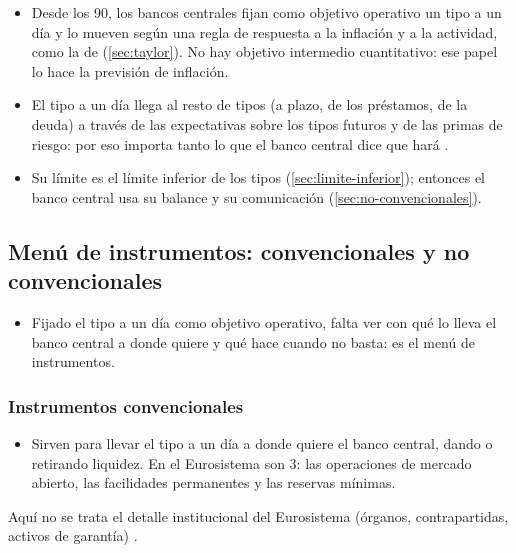 \documentclass[11pt]{article}
\begin{document}
\begin{itemize}
\item Desde los 90, los bancos centrales fijan como objetivo operativo un tipo a un día y lo mueven según una regla de respuesta a la inflación y a la actividad, como la de  (\ref{sec:taylor}). No hay objetivo intermedio cuantitativo: ese papel lo hace la previsión de inflación.
\item El tipo a un día llega al resto de tipos (a plazo, de los préstamos, de la deuda) a través de las expectativas sobre los tipos futuros y de las primas de riesgo: por eso importa tanto lo que el banco central dice que hará .
\item Su límite es el límite inferior de los tipos (\ref{sec:limite-inferior}); entonces el banco central usa su balance y su comunicación (\ref{sec:no-convencionales}).
\end{itemize}

\subsection{Menú de instrumentos: convencionales y no convencionales}\label{sec:instrumentos}

\begin{itemize}
\item Fijado el tipo a un día como objetivo operativo, falta ver con qué lo lleva el banco central a donde quiere y qué hace cuando no basta: es el menú de instrumentos.
\end{itemize}

\subsubsection{Instrumentos convencionales}\label{sec:convencionales}

\begin{itemize}
\item Sirven para llevar el tipo a un día a donde quiere el banco central, dando o retirando liquidez. En el Eurosistema son 3: las operaciones de mercado abierto, las facilidades permanentes y las reservas mínimas\nocite{BdE2026Instrumentos}.
\end{itemize}

\begin{anotaciones}
Aquí no se trata el detalle institucional del Eurosistema (órganos, contrapartidas, activos de garantía) .
\end{anotaciones}
\end{document}
